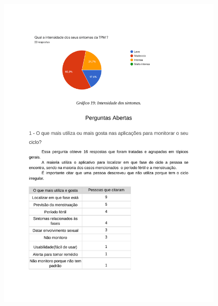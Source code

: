 \begin{apendicesenv}
    \begin{figure}[h]
        \centering
        \includegraphics[keepaspectratio=true,scale=0.7]{figuras/Tab15.pdf}
    \end{figure}
    

\end{apendicesenv}
